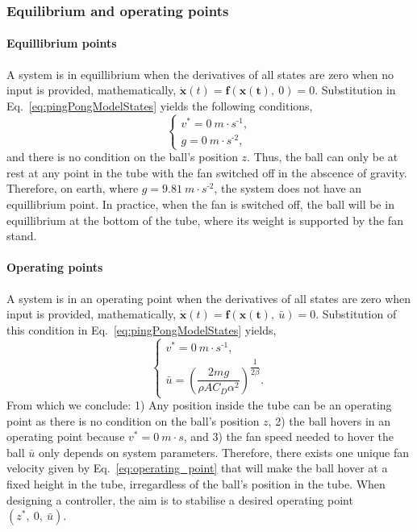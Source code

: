 \documentclass[10pt,twoside,openright]{article}
\begin{document}
\subsubsection{Equilibrium and operating points}

\paragraph{Equillibrium points} A system is in equillibrium when the derivatives of all states are zero when no input is provided, mathematically, $\bm{\dot{x}}(t) = \bm{f}(\bm{x(t)},~ 0) = 0$. Substitution in Eq.~\ref{eq:pingPongModelStates} yields the following conditions,
\begin{equation}
\begin{cases}
v^* = 0~m \cdot s^{\text{-}1}, \\
g = 0~m \cdot s^{\text{-}2},
\end{cases}
\end{equation}
and there is no condition on the ball's position $z$. Thus, the ball can only be at rest at any point in the tube with the fan switched off in the abscence of gravity. Therefore, on earth, where $g = 9.81~m \cdot s^{\text{-}2}$, the system does not have an equillibrium point. In practice, when the fan is switched off, the ball will be in equillibrium at the bottom of the tube, where its weight is supported by the fan stand.

\paragraph{Operating points} A system is in an operating point when the derivatives of all states are zero when input is provided, mathematically, $\bm{\dot{x}}(t) = \bm{f}\left(\bm{x(t)},~\bar{u}\right) = 0$. Substitution of this condition in Eq.~\ref{eq:pingPongModelStates} yields,
\begin{equation}\label{eq:operating_point}
\begin{cases}
v^* = 0~m \cdot s^{\text{-}1}, \\
\bar{u} = \left(\dfrac{2 m g}{\rho A C_D \alpha^2}\right)^{\dfrac{1}{2 \beta}}.
\end{cases}
\end{equation}
From which we conclude: 1) Any position inside the tube can be an operating point as there is no condition on the ball's position $z$, 2) the ball hovers in an operating point because $v^*=0~m \cdot s$, and 3) the fan speed needed to hover the ball $\bar{u}$ only depends on system parameters. Therefore, there exists one unique fan velocity given by Eq.~\ref{eq:operating_point} that will make the ball hover at a fixed height in the tube, irregardless of the ball's position in the tube. When designing a controller, the aim is to stabilise a desired operating point $(z^*,~0,~\bar{u})$.
\end{document}
